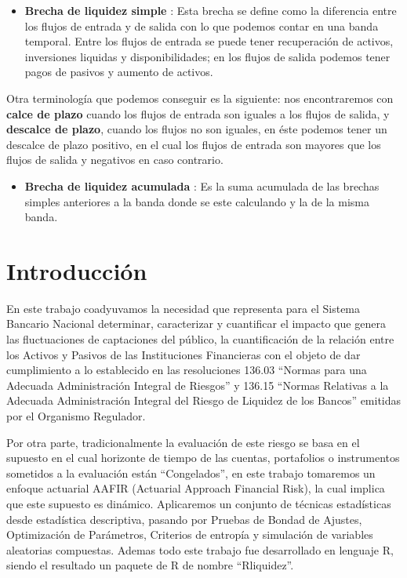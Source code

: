 \documentclass[]{article}
\providecommand{\tightlist}{%
  \setlength{\itemsep}{0pt}\setlength{\parskip}{0pt}}
\begin{document}
\begin{itemize}
\tightlist
\item
  \textbf{Brecha de liquidez simple} : Esta brecha se define como la
  diferencia entre los flujos de entrada y de salida con lo que podemos
  contar en una banda temporal. Entre los flujos de entrada se puede
  tener recuperación de activos, inversiones liquidas y
  disponibilidades; en los flujos de salida podemos tener pagos de
  pasivos y aumento de activos.
\end{itemize}

Otra terminología que podemos conseguir es la siguiente: nos
encontraremos con \textbf{calce de plazo} cuando los flujos de entrada
son iguales a los flujos de salida, y \textbf{descalce de plazo}, cuando
los flujos no son iguales, en éste podemos tener un descalce de plazo
positivo, en el cual los flujos de entrada son mayores que los flujos de
salida y negativos en caso contrario.

\begin{itemize}
\tightlist
\item
  \textbf{Brecha de liquidez acumulada} : Es la suma acumulada de las
  brechas simples anteriores a la banda donde se este calculando y la de
  la misma banda.
\end{itemize}

\hypertarget{introduccion}{%
\section{Introducción}\label{introduccion}}

En este trabajo coadyuvamos la necesidad que representa para el Sistema
Bancario Nacional determinar, caracterizar y cuantificar el impacto que
genera las fluctuaciones de captaciones del público, la cuantificación
de la relación entre los Activos y Pasivos de las Instituciones
Financieras con el objeto de dar cumplimiento a lo establecido en las
resoluciones 136.03 ``Normas para una Adecuada Administración Integral
de Riesgos'' y 136.15 ``Normas Relativas a la Adecuada Administración
Integral del Riesgo de Liquidez de los Bancos'' emitidas por el
Organismo Regulador.

Por otra parte, tradicionalmente la evaluación de este riesgo se basa en
el supuesto en el cual horizonte de tiempo de las cuentas, portafolios o
instrumentos sometidos a la evaluación están ``Congelados'', en este
trabajo tomaremos un enfoque actuarial AAFIR (Actuarial Approach
Financial Risk), la cual implica que este supuesto es dinámico.
Aplicaremos un conjunto de técnicas estadísticas desde estadística
descriptiva, pasando por Pruebas de Bondad de Ajustes, Optimización de
Parámetros, Criterios de entropía y simulación de variables aleatorias
compuestas. Ademas todo este trabajo fue desarrollado en lenguaje R,
siendo el resultado un paquete de R de nombre ``Rliquidez''.
\end{document}
